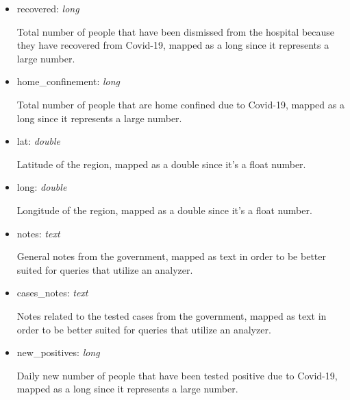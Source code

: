 \documentclass[12pt, a4paper]{article}
\begin{document}
\begin{itemize}
\begin{itemize}
      \item recovered: \emph{long} \\
        \begin{footnotesize}
          Total number of people that have been dismissed from the hospital because they
          have recovered from Covid-19, mapped as a long since it represents a large 
          number.
        \end{footnotesize}
      \item home\_confinement: \emph{long} \\
        \begin{footnotesize}
          Total number of people that are home confined due to Covid-19, mapped as a long
          since it represents a large number.
        \end{footnotesize}
      \item lat: \emph{double} \\
        \begin{footnotesize}
          Latitude of the region, mapped as a double since it's a float number.
        \end{footnotesize}
      \item long: \emph{double} \\
        \begin{footnotesize}
          Longitude of the region, mapped as a double since it's a float number.
        \end{footnotesize}
      \item notes: \emph{text} \\
        \begin{footnotesize}
          General notes from the government, mapped as text in order to be better 
          suited for queries that utilize an analyzer.
        \end{footnotesize}
      \item cases\_notes: \emph{text} \\
        \begin{footnotesize}
          Notes related to the tested cases from the government, mapped as text in order
          to be better suited for queries that utilize an analyzer.
        \end{footnotesize}
      \item new\_positives: \emph{long} \\
        \begin{footnotesize}
          Daily new number of people that have been tested positive due to Covid-19, 
          mapped as a long since it represents a large number.

\end{footnotesize}
\end{itemize}
\end{itemize}
\end{document}
